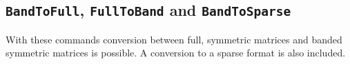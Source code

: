 \documentclass[11pt]{article}
\begin{document}
\subsection{\texttt{BandToFull}, \texttt{FullToBand} and \texttt{BandToSparse}}
With these commands conversion between full, symmetric matrices and banded
symmetric matrices is possible. A conversion to a sparse format is also
included.


%

%






\end{document}
